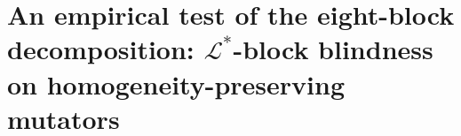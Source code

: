 %
%
%
%
%
%

\section{An empirical test of the eight-block decomposition: $\mathcal{L}^{*}$-block blindness on homogeneity-preserving mutators}
\label{sec:empirical-vs-sota}

